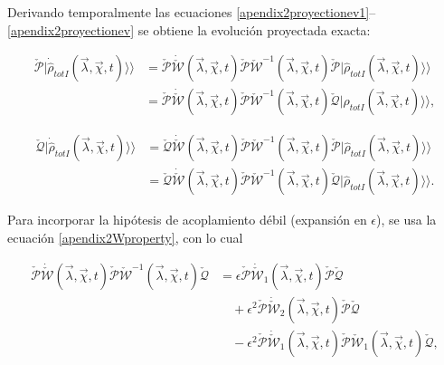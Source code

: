 \begin{appendixs}
Derivando temporalmente las ecuaciones \eqref{apendix2proyectionev1}–\eqref{apendix2proyectionev} se obtiene la evolución proyectada exacta:

\begin{align*}
\check{\mathcal{P}}|\dot{\hat{\rho}}_{totI}(\vec{\lambda},\vec{\chi},t) \rangle \rangle &= \check{\mathcal{P}}\dot{\check{\mathcal{W}}}(\vec{\lambda},\vec{\chi},t)\check{\mathcal{P}}\check{\mathcal{W}}^{-1}(\vec{\lambda},\vec{\chi},t)\check{\mathcal{P}}|\hat{\rho}_{totI}(\vec{\lambda},\vec{\chi},t)\rangle \rangle \\
&= \check{\mathcal{P}}\dot{\check{\mathcal{W}}}(\vec{\lambda},\vec{\chi},t)\check{\mathcal{P}}\check{\mathcal{W}}^{-1}(\vec{\lambda},\vec{\chi},t)\check{\mathcal{Q}}|\hat{\rho}_{totI}(\vec{\lambda},\vec{\chi},t)\rangle \rangle ,
\end{align*}

\begin{align*}
\check{\mathcal{Q}}|\dot{\hat{\rho}}_{totI}(\vec{\lambda},\vec{\chi},t) \rangle \rangle &= \check{\mathcal{Q}}\dot{\check{\mathcal{W}}}(\vec{\lambda},\vec{\chi},t)\check{\mathcal{P}}\check{\mathcal{W}}^{-1}(\vec{\lambda},\vec{\chi},t)\check{\mathcal{P}}|\hat{\rho}_{totI}(\vec{\lambda},\vec{\chi},t)\rangle \rangle \\
&= \check{\mathcal{Q}}\dot{\check{\mathcal{W}}}(\vec{\lambda},\vec{\chi},t)\check{\mathcal{P}}\check{\mathcal{W}}^{-1}(\vec{\lambda},\vec{\chi},t)\check{\mathcal{Q}}|\hat{\rho}_{totI}(\vec{\lambda},\vec{\chi},t)\rangle \rangle .
\end{align*}

Para incorporar la hipótesis de acoplamiento débil (expansión en \(\epsilon\)), se usa la ecuación \eqref{apendix2Wproperty}, con lo cual

\begin{align*}
\check{\mathcal{P}}\dot{\check{\mathcal{W}}}(\vec{\lambda},\vec{\chi},t)\check{\mathcal{P}}\check{\mathcal{W}}^{-1}(\vec{\lambda},\vec{\chi},t)\check{\mathcal{Q}} &= \epsilon \check{\mathcal{P}}\dot{\check{\mathcal{W}}}_{1}(\vec{\lambda},\vec{\chi},t) \check{\mathcal{P}}\check{\mathcal{Q}} \\
&\quad + \epsilon^{2} \check{\mathcal{P}}\dot{\check{\mathcal{W}}}_{2}(\vec{\lambda},\vec{\chi},t) \check{\mathcal{P}}\check{\mathcal{Q}} \\
&\quad - \epsilon^{2}\check{\mathcal{P}}\dot{\check{\mathcal{W}}}_{1}(\vec{\lambda},\vec{\chi},t)\check{\mathcal{P}} \check{\mathcal{W}}_{1}(\vec{\lambda},\vec{\chi},t)\check{\mathcal{Q}},
\end{align*}


\end{appendixs}
